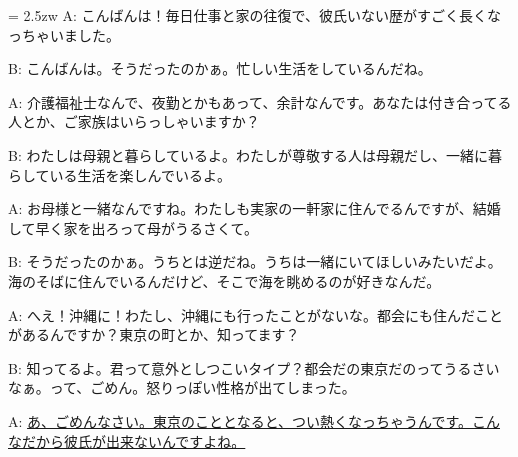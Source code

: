 \documentclass[11pt]{amsart}
\title{}
\author{}
\newenvironment{hangall}[1]{\hangindent = 2.5zw\everypar{\hangindent = 2.5zw}}{}
\begin{document}
\maketitle
\begin{hangall}{}%
A: こんばんは！毎日仕事と家の往復で、彼氏いない歴がすごく長くなっちゃいました。

B: こんばんは。そうだったのかぁ。忙しい生活をしているんだね。

A: 介護福祉士なんで、夜勤とかもあって、余計なんです。あなたは付き合ってる人とか、ご家族はいらっしゃいますか？

B: わたしは母親と暮らしているよ。わたしが尊敬する人は母親だし、一緒に暮らしている生活を楽しんでいるよ。

A: お母様と一緒なんですね。わたしも実家の一軒家に住んでるんですが、結婚して早く家を出ろって母がうるさくて。

B: そうだったのかぁ。うちとは逆だね。うちは一緒にいてほしいみたいだよ。海のそばに住んでいるんだけど、そこで海を眺めるのが好きなんだ。

A: へえ！沖縄に！わたし、沖縄にも行ったことがないな。都会にも住んだことがあるんですか？東京の町とか、知ってます？

B: 知ってるよ。君って意外としつこいタイプ？都会だの東京だのってうるさいなぁ。って、ごめん。怒りっぽい性格が出てしまった。

A: \ul{あ、ごめんなさい。東京のこととなると、つい熱くなっちゃうんです。こんなだから彼氏が出来ないんですよね。}\end{hangall}
\end{document}
